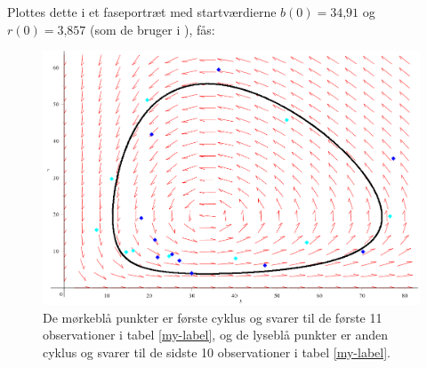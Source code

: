 Plottes dette i et faseportræt med startværdierne $b(0)=34\text{,}91$ og $r(0)=3\text{,}857$ (som de bruger i \citep{Lynx}), fås:
\begin{figure} [H]
    \centering
    \includegraphics[scale=0.6]{Images/lynx.PNG}
    \caption{De mørkeblå punkter er første cyklus og svarer til de første 11 observationer i tabel \ref{my-label}, og de lyseblå punkter er anden cyklus og svarer til de sidste 10 observationer i tabel \ref{my-label}.}
    \label{lynxfp}
\end{figure}





